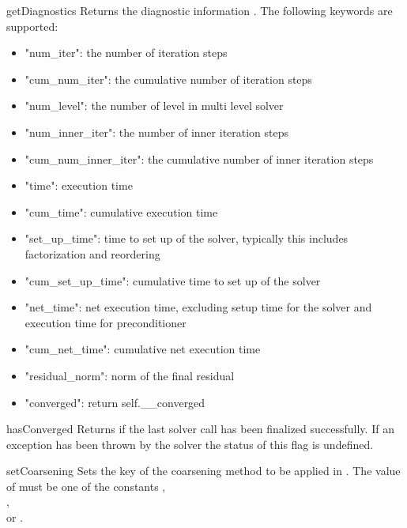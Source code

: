 \begin{methoddesc}[SolverOptions]{getDiagnostics}{}
Returns the diagnostic information . The following keywords are
supported:
\begin{itemize}
 \item "num_iter": the number of iteration steps
 \item "cum_num_iter": the cumulative number of iteration steps
 \item "num_level": the number of level in multi level solver
 \item "num_inner_iter": the number of inner iteration steps
 \item"cum_num_inner_iter": the cumulative number of inner iteration steps
 \item"time": execution time 
 \item "cum_time": cumulative execution time
 \item "set_up_time": time to set up of the solver, typically this includes factorization and reordering
 \item "cum_set_up_time": cumulative time to set up of the solver
 \item "net_time": net execution time, excluding setup time for the solver and execution time for preconditioner
 \item "cum_net_time": cumulative net execution time
 \item "residual_norm": norm of the final residual
 \item "converged": return self.__converged     
\end{itemize}
\end{methoddesc}


\begin{methoddesc}[SolverOptions]{hasConverged}{}
Returns \True if the last solver call has been finalized successfully.
If an exception has been thrown by the solver the status of this flag is undefined.
\end{methoddesc}

\begin{methoddesc}[SolverOptions]{setCoarsening}{}
Sets the key of the coarsening method to be applied in \AMG.
The value of  must be one of the constants
, \\
, \\or {}.
\end{methoddesc}

